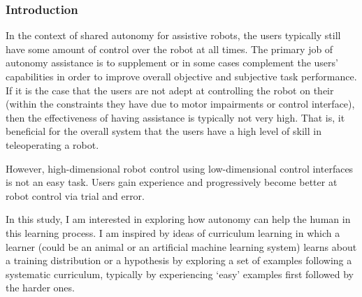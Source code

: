 \documentclass[12pt]{article}
\begin{document}
\subsubsection{Introduction}

In the context of shared autonomy for assistive robots, the users typically still have some amount of control over the robot at all times. The primary job of autonomy assistance is to supplement or in some cases complement the users' capabilities in order to improve overall objective and subjective task performance. If it is the case that the users are not adept at controlling the robot on their (within the constraints they have due to motor impairments or control interface), then the effectiveness of having assistance is typically not very high. That is, it beneficial for the overall system that the users have a high level of skill in teleoperating a robot. 

However, high-dimensional robot control using low-dimensional control interfaces is not an easy task. Users gain experience and progressively become better at robot control via trial and error.

In this study, I am interested in exploring how autonomy can help the human in this learning process. I am inspired by ideas of curriculum learning in which a learner (could be an animal or an artificial machine learning system) learns about a training distribution or a hypothesis by exploring a set of examples following a systematic curriculum, typically by experiencing `easy' examples first followed by the harder ones. 
%
%
%

\end{document}
